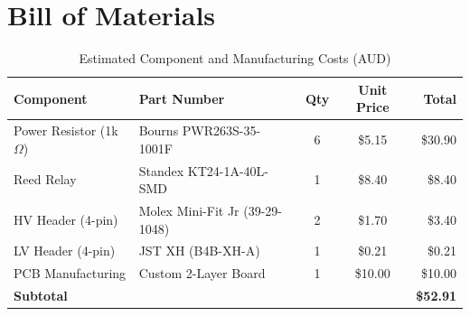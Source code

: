 \documentclass{article}
\begin{document}
\section{Bill of Materials}
\begin{table}[H]
\centering
\caption{Estimated Component and Manufacturing Costs (AUD)}
\begin{tabular}{|l|l|c|c|r|}
\hline
    \textbf{Component} & \textbf{Part Number} & \textbf{Qty} & \textbf{Unit Price} & \textbf{Total} \\ \hline
    Power Resistor (1k$\Omega$) & Bourns PWR263S-35-1001F & 6 & \$5.15 & \$30.90 \\ \hline
    Reed Relay & Standex KT24-1A-40L-SMD & 1 & \$8.40 & \$8.40 \\ \hline
    HV Header (4-pin) & Molex Mini-Fit Jr (39-29-1048) & 2 & \$1.70 & \$3.40 \\ \hline
    LV Header (4-pin) & JST XH (B4B-XH-A) & 1 & \$0.21 & \$0.21 \\ \hline
    PCB Manufacturing & Custom 2-Layer Board & 1 & \$10.00 & \$10.00 \\ \hline
    \multicolumn{4}{|l|}{\textbf{Subtotal}} & \textbf{\$52.91} \\ \hline
\end{tabular}
\end{table}
\end{document}
